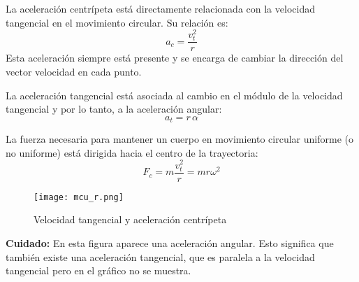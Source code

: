 \begin{tcolorbox}[remember, title=Aceleración centrípeta (\(a_c\))]
La aceleración centrípeta está directamente relacionada con la velocidad tangencial en el movimiento circular. Su relación es:
\[
a_c = \frac{v_t^2}{r}
\]
Esta aceleración siempre está presente y se encarga de cambiar la dirección del vector velocidad en cada punto.
\end{tcolorbox}

\begin{tcolorbox}[remember, title=Aceleración tangencial (\(a_t\))]
La aceleración tangencial está asociada al cambio en el módulo de la velocidad tangencial y por lo tanto, a la aceleración angular:
\[
a_t = r \, \alpha
\]
\end{tcolorbox}

\begin{tcolorbox}[remember, title=Fuerza centrípeta (\(F_c\))]
La fuerza necesaria para mantener un cuerpo en movimiento circular uniforme (o no uniforme) está dirigida hacia el centro de la trayectoria:
\[
F_c = m \frac{v_t^2}{r} = m r \omega^2
\]
\end{tcolorbox}

\begin{figure}[ht]
  \centering
  \texttt{[image: mcu\_r.png]}
  \caption{Velocidad tangencial y aceleración centrípeta}
\end{figure}

\textbf{Cuidado:} En esta figura aparece una aceleración angular. Esto significa que también existe una aceleración tangencial, que es paralela a la velocidad tangencial pero en el gráfico no se muestra.